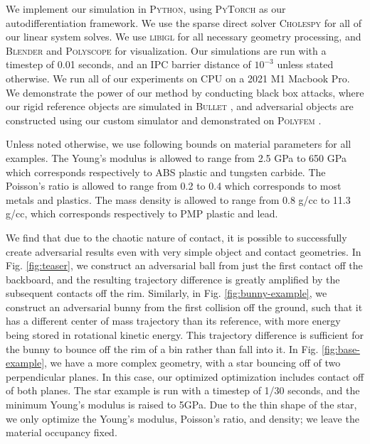 We implement our simulation in \textsc{Python}, using \textsc{PyTorch}  \cite{pytorch-citation} as our autodifferentiation framework. We use the sparse direct solver \textsc{Cholespy} \cite{inverse-rendering-geometry} for all of our linear system solves. We use \textsc{libigl} \cite{libigl} for all necessary geometry processing, and \textsc{Blender} and \textsc{Polyscope} \cite{polyscope} for visualization.
Our simulations are run with a timestep of 0.01 seconds, and an IPC barrier distance of $10^{-3}$ unless stated otherwise. We run all of our experiments on CPU on a 2021 M1 Macbook Pro. We demonstrate the power of our method by conducting black box attacks, where our rigid reference objects are simulated in \textsc{Bullet} \cite{pybullet}, and adversarial objects are constructed using our custom simulator and demonstrated on \textsc{Polyfem} \cite{polyfem}. 

Unless noted otherwise, we use following bounds on material parameters for all examples. The Young's modulus is allowed to range from 2.5 GPa to 650 GPa which corresponds respectively to ABS plastic and tungsten carbide. The Poisson's ratio is allowed to range from 0.2 to 0.4 which corresponds to most metals and plastics. The mass density is allowed to range from 0.8 g/cc to 11.3 g/cc, which corresponds respectively to PMP plastic and lead. 

We find that due to the chaotic nature of contact, it is possible to successfully create adversarial results even with very simple object and contact geometries. 
In Fig. \ref{fig:teaser}, we construct an adversarial ball from just the first contact off the backboard, and the resulting trajectory difference is greatly amplified by the subsequent contacts off the rim. Similarly, in Fig. \ref{fig:bunny-example}, we construct an adversarial bunny from the first collision off the ground, such that it has a different center of mass trajectory than its reference, with more energy being stored in rotational kinetic energy. This trajectory difference is sufficient for the bunny to bounce off the rim of a bin rather than fall into it.
In Fig. \ref{fig:base-example}, we have a more complex geometry, with a star bouncing off of two perpendicular planes. In this case, our optimized optimization includes contact off of both planes. The star example is run with a timestep of 1/30 seconds, and the minimum Young's modulus is raised to 5GPa. Due to the thin shape of the star, we only optimize the Young's modulus, Poisson's ratio, and density; we leave the material occupancy fixed.

